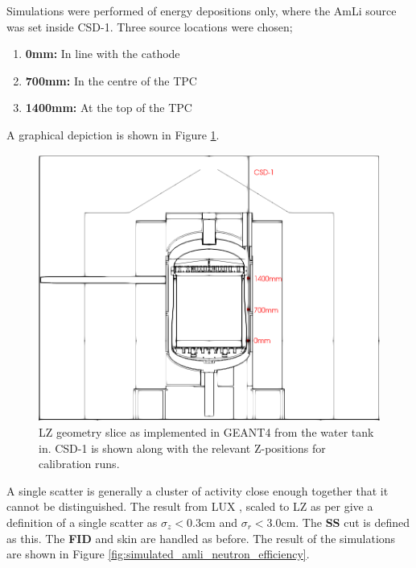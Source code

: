 

\par
Simulations were performed of energy depositions only, where the AmLi source was set inside CSD-1.
Three source locations were chosen;
\begin{enumerate}
    \item \textbf{0mm:} In line with the cathode
    \item \textbf{700mm:} In the centre of the TPC
    \item \textbf{1400mm:} At the top of the TPC
\end{enumerate}
A graphical depiction is shown in Figure \ref{fig:CSD1_Geometry}. 

\begin{figure}[!htbp]
\centering
\includegraphics[width=\textwidth]{Figures/Geometry/csd1_geometry_black_and_white.png}
\caption{LZ geometry slice as implemented in GEANT4 from the water tank in. CSD-1 is shown along with the relevant Z-positions for calibration runs.}
\label{fig:CSD1_Geometry}
\end{figure}

\par
A single scatter is generally a cluster of activity close enough together that it cannot be distinguished.
The result from LUX \cite{lux_position_reconstruction_ref}, scaled to LZ as per \cite{LZ_TechnicalDesignReview_ref} give a definition of a single scatter as ${\sigma}_{z}<0.3$cm and ${\sigma}_{r}<3.0$cm.
The \textbf{SS} cut is defined as this.
The \textbf{FID} and skin are handled as before.
The result of the simulations are shown in Figure \ref{fig:simulated_amli_neutron_efficiency}.


